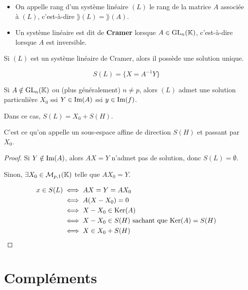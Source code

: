\documentclass[12pt, a4paper]{report}
\begin{document}
\begin{definition}
    \begin{itemize}
        \item On appelle rang d'un système linéaire $(L)$ le rang de la matrice $A$ associée à $(L)$, c'est-à-dire $\rang(L) = \rang(A)$.

        \item Un système linéaire est dit de \textbf{Cramer} lorsque $A \in \mathrm{GL}_n(\mathbb{K})$, c'est-à-dire lorsque $A$ est inversible.
    \end{itemize}
\end{definition}

\begin{property}
    Si $(L)$ est un système linéaire de Cramer, alors il possède une solution unique.

    $$S(L) = \{ X = A^{-1} Y \}$$

\end{property}

\begin{property}
    Si $A \notin \mathrm{GL}_n(\mathbb{K})$ ou (plus généralement) $n\ne p$, alors $(L)$ admet une solution particulière $X_0$ ssi $Y \in \mathrm{Im}(A)$ ssi $y \in \mathrm{Im}(f)$.

    Dans ce cas, $S(L) = X_0 + S(H)$.

    C'est ce qu'on appelle un sous-espace affine de direction $S(H)$ et passant par $X_0$.
\end{property}

\begin{proof}
    Si $Y \notin \mathrm{Im}(A)$, alors $AX=Y$ n'admet pas de solution, donc $S(L) = \emptyset$.

    Sinon, $\exists X_0 \in \mathcal M_{p,1}(\mathbb{K})$ telle que $AX_0 = Y$.

    \begin{align*}
        x \in S(L) & \iff AX = Y = AX_0 \\
        & \iff A(X - X_0) = 0 \\
        & \iff X - X_0 \in \mathrm{Ker}(A) \\
        & \iff X - X_0 \in S(H) \text{ sachant que } \mathrm{Ker}(A) = S(H) \\
        & \iff X \in X_0 + S(H)
    \end{align*}
\end{proof}

\chapter{Compléments}
\end{document}
